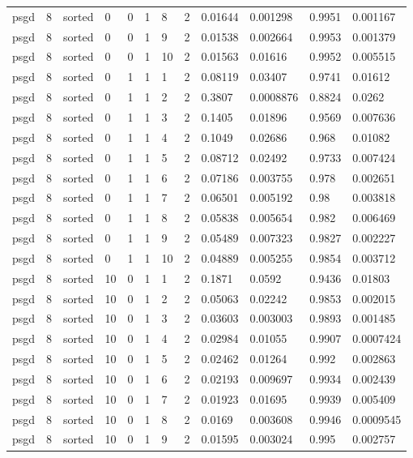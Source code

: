 \begin{tabular}{llllllllllll}
psgd & 8 & sorted & 0 & 0 & 1 & 8 & 2 & 0.01644 & 0.001298 & 0.9951 & 0.001167 \\
psgd & 8 & sorted & 0 & 0 & 1 & 9 & 2 & 0.01538 & 0.002664 & 0.9953 & 0.001379 \\
psgd & 8 & sorted & 0 & 0 & 1 & 10 & 2 & 0.01563 & 0.01616 & 0.9952 & 0.005515 \\
psgd & 8 & sorted & 0 & 1 & 1 & 1 & 2 & 0.08119 & 0.03407 & 0.9741 & 0.01612 \\
psgd & 8 & sorted & 0 & 1 & 1 & 2 & 2 & 0.3807 & 0.0008876 & 0.8824 & 0.0262 \\
psgd & 8 & sorted & 0 & 1 & 1 & 3 & 2 & 0.1405 & 0.01896 & 0.9569 & 0.007636 \\
psgd & 8 & sorted & 0 & 1 & 1 & 4 & 2 & 0.1049 & 0.02686 & 0.968 & 0.01082 \\
psgd & 8 & sorted & 0 & 1 & 1 & 5 & 2 & 0.08712 & 0.02492 & 0.9733 & 0.007424 \\
psgd & 8 & sorted & 0 & 1 & 1 & 6 & 2 & 0.07186 & 0.003755 & 0.978 & 0.002651 \\
psgd & 8 & sorted & 0 & 1 & 1 & 7 & 2 & 0.06501 & 0.005192 & 0.98 & 0.003818 \\
psgd & 8 & sorted & 0 & 1 & 1 & 8 & 2 & 0.05838 & 0.005654 & 0.982 & 0.006469 \\
psgd & 8 & sorted & 0 & 1 & 1 & 9 & 2 & 0.05489 & 0.007323 & 0.9827 & 0.002227 \\
psgd & 8 & sorted & 0 & 1 & 1 & 10 & 2 & 0.04889 & 0.005255 & 0.9854 & 0.003712 \\
psgd & 8 & sorted & 10 & 0 & 1 & 1 & 2 & 0.1871 & 0.0592 & 0.9436 & 0.01803 \\
psgd & 8 & sorted & 10 & 0 & 1 & 2 & 2 & 0.05063 & 0.02242 & 0.9853 & 0.002015 \\
psgd & 8 & sorted & 10 & 0 & 1 & 3 & 2 & 0.03603 & 0.003003 & 0.9893 & 0.001485 \\
psgd & 8 & sorted & 10 & 0 & 1 & 4 & 2 & 0.02984 & 0.01055 & 0.9907 & 0.0007424 \\
psgd & 8 & sorted & 10 & 0 & 1 & 5 & 2 & 0.02462 & 0.01264 & 0.992 & 0.002863 \\
psgd & 8 & sorted & 10 & 0 & 1 & 6 & 2 & 0.02193 & 0.009697 & 0.9934 & 0.002439 \\
psgd & 8 & sorted & 10 & 0 & 1 & 7 & 2 & 0.01923 & 0.01695 & 0.9939 & 0.005409 \\
psgd & 8 & sorted & 10 & 0 & 1 & 8 & 2 & 0.0169 & 0.003608 & 0.9946 & 0.0009545 \\
psgd & 8 & sorted & 10 & 0 & 1 & 9 & 2 & 0.01595 & 0.003024 & 0.995 & 0.002757 \\

\end{tabular}
